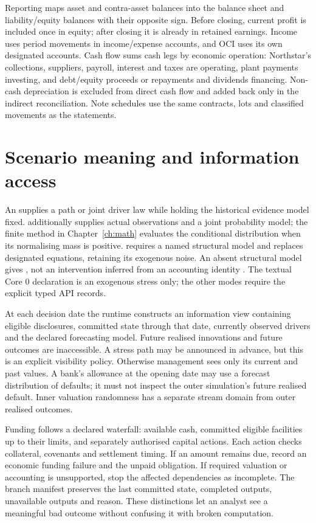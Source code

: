 Reporting maps asset and contra-asset balances into the balance sheet and
liability/equity balances with their opposite sign. Before closing, current
profit is included once in equity; after closing it is already in retained
earnings. Income uses period movements in income/expense accounts, and OCI
uses its own designated accounts. Cash flow sums cash legs by economic
operation: Northstar's collections, suppliers, payroll, interest and taxes
are operating, plant payments investing, and debt/equity proceeds or repayments
and dividends financing. Non-cash depreciation is excluded from direct cash
flow and added back only in the indirect reconciliation. Note schedules use
the same contracts, lots and classified movements as the statements.

\section{Scenario meaning and information access}

An  supplies a path or joint driver law while holding the
historical evidence model fixed.  additionally
supplies actual observations and a joint probability model; the finite method
in Chapter~\ref{ch:math} evaluates the conditional distribution when its
normalising mass is positive.  requires a named
structural model and replaces designated equations, retaining its exogenous
noise. An absent structural model gives , not an
intervention inferred from an accounting identity \citep[Section 3.2.1]{pearl2009}.
The textual Core 0  declaration is an exogenous stress only;
the other modes require the explicit typed API records.

At each decision date the runtime constructs an information view containing
eligible disclosures, committed state through that date, currently observed
drivers and the declared forecasting model. Future realised innovations and
future outcomes are inaccessible. A stress path may be announced in advance,
but this is an explicit visibility policy. Otherwise management sees only its
current and past values. A bank's allowance at the opening date may use a
forecast distribution of defaults; it must not inspect the outer simulation's
future realised default. Inner valuation randomness has a separate stream
domain from outer realised outcomes.

Funding follows a declared waterfall: available cash, committed eligible
facilities up to their limits, and separately authorised capital actions.
Each action checks collateral, covenants and settlement timing. If an amount
remains due, record an economic funding failure and the unpaid obligation.
If required valuation or accounting is unsupported, stop the affected
dependencies as incomplete. The branch manifest preserves the last committed
state, completed outputs, unavailable outputs and reason. These distinctions
let an analyst see a meaningful bad outcome without confusing it with broken
computation.
